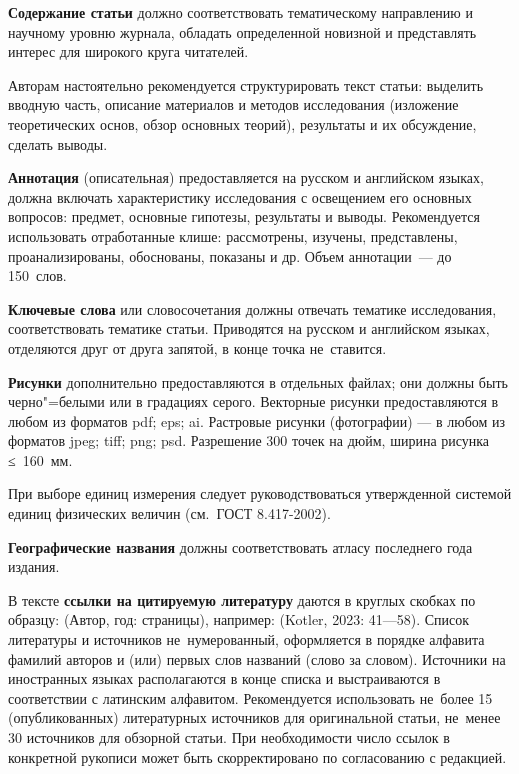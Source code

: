 \begin{multicols}{2}
    \textbf{Содержание статьи} должно соответствовать тематическому направлению и научному уровню журнала, обладать определенной новизной и представлять интерес для
    широкого круга читателей.

    Авторам настоятельно рекомендуется
    структурировать текст статьи: выделить
    вводную часть, описание материалов и методов исследования (изложение теоретических основ, обзор основных теорий), результаты и их обсуждение, сделать выводы.
    
    \textbf{Аннотация} (описательная) предоставляется на русском и английском языках,
    должна включать характеристику исследования с освещением его основных вопросов:
    предмет, основные гипотезы, результаты
    и выводы. Рекомендуется использовать отработанные клише: рассмотрены, изучены,
    представлены, проанализированы, обоснованы, показаны и др. Объем аннотации — 
    до 150 слов.
    
    \textbf{Ключевые слова} или словосочетания
    должны отвечать тематике исследования, соответствовать тематике статьи. Приводятся
    на русском и английском языках, отделяются
    друг от друга запятой, в конце точка не~ставится.
    
    \textbf{Рисунки} дополнительно предоставляются в отдельных файлах; они должны
    быть черно"=белыми или в градациях серого.
    Векторные рисунки предоставляются в любом
    из форматов pdf; eps; ai. Растровые рисунки
    (фотографии) — в любом из форматов jpeg;
tiff; png; psd. Разрешение 300 точек на дюйм,
ширина рисунка ≤ 160 мм.

При выборе единиц измерения следует
руководствоваться утвержденной системой
единиц физических величин (см. ГОСТ
\mbox{8.417-2002}).

\textbf{Географические названия} должны соответствовать атласу последнего года издания.

В тексте \textbf{ссылки на цитируемую литературу} даются в круглых скобках по образцу:
(Автор, год: страницы), например: (Kotler,
2023: 41—58). Список литературы и источников не~нумерованный, оформляется в порядке алфавита фамилий авторов и (или) первых слов названий (слово за словом). Источники на иностранных языках располагаются
в конце списка и выстраиваются в соответствии с латинским алфавитом. Рекомендуется
использовать не~более 15 (опубликованных)
литературных источников для оригинальной
статьи, не~менее 30 источников для обзорной
статьи. При необходимости число ссылок
в конкретной рукописи может быть скорректировано по согласованию с редакцией.


\end{multicols}
